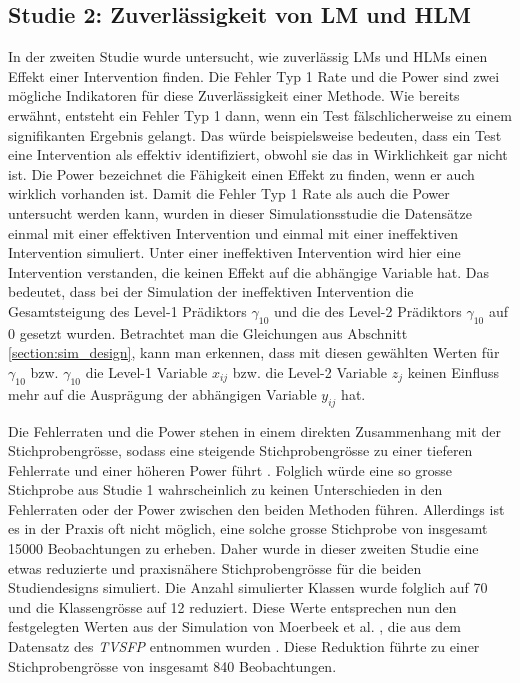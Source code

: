 \documentclass[12pt, a4paper]{article}\usepackage[]{graphicx}\usepackage[]{color}
\begin{document}
\subsection{Studie 2: Zuverlässigkeit von LM und HLM}
In der zweiten Studie wurde untersucht, wie zuverlässig LMs und HLMs einen Effekt einer Intervention finden. Die Fehler Typ 1 Rate und die Power sind zwei mögliche Indikatoren für diese Zuverlässigkeit einer Methode. Wie bereits erwähnt, entsteht ein Fehler Typ 1 dann, wenn ein Test fälschlicherweise zu einem signifikanten Ergebnis gelangt. Das würde beispielsweise bedeuten, dass ein Test eine Intervention als effektiv identifiziert, obwohl sie das in Wirklichkeit gar nicht ist. Die Power bezeichnet die Fähigkeit einen Effekt zu finden, wenn er auch wirklich vorhanden ist. Damit die Fehler Typ 1 Rate als auch die Power untersucht werden kann, wurden in dieser Simulationsstudie die Datensätze einmal mit einer effektiven Intervention und einmal mit einer ineffektiven Intervention simuliert. Unter einer ineffektiven Intervention wird hier eine Intervention verstanden, die keinen Effekt auf die abhängige Variable hat. Das bedeutet, dass bei der Simulation der ineffektiven Intervention die Gesamtsteigung des Level-1 Prädiktors $\gamma_{10}$ und die des Level-2 Prädiktors $\gamma_{10}$ auf 0 gesetzt wurden. Betrachtet man die Gleichungen aus Abschnitt \ref{section:sim_design}, kann man erkennen, dass mit diesen gewählten Werten für $\gamma_{10}$ bzw. $\gamma_{10}$ die Level-1 Variable $x_{ij}$ bzw. die Level-2 Variable $z_{j}$ keinen Einfluss mehr auf die Ausprägung der abhängigen Variable $y_{ij}$ hat.

Die Fehlerraten und die Power stehen in einem direkten Zusammenhang mit der Stichprobengrösse, sodass eine steigende Stichprobengrösse zu einer tieferen Fehlerrate und einer höheren Power führt \citep{snijders2005samplesizepower}. Folglich würde eine so grosse Stichprobe aus Studie 1 wahrscheinlich zu keinen Unterschieden in den Fehlerraten oder der Power zwischen den beiden Methoden führen. Allerdings ist es in der Praxis oft nicht möglich, eine solche grosse Stichprobe von insgesamt 15000 Beobachtungen zu erheben. Daher wurde in dieser zweiten Studie eine etwas reduzierte und praxisnähere Stichprobengrösse für die beiden Studiendesigns simuliert. Die Anzahl simulierter Klassen wurde folglich auf 70 und die Klassengrösse auf 12 reduziert. Diese Werte entsprechen nun den festgelegten Werten aus der Simulation von Moerbeek et al. \citeyearpar{MOERBEEK2003341}, die aus dem Datensatz des \textit{TVSFP} entnommen wurden \citep{FLAY1995smoking}. Diese Reduktion führte zu einer Stichprobengrösse von insgesamt 840 Beobachtungen. 
\end{document}
